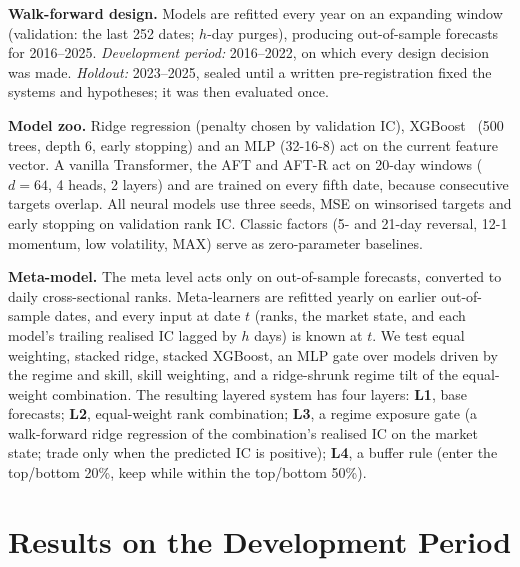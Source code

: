 \textbf{Walk-forward design.} Models are refitted every year on an expanding window (validation: the last 252 dates; $h$-day purges), producing out-of-sample forecasts for 2016--2025. \emph{Development period:} 2016--2022, on which every design decision was made. \emph{Holdout:} 2023--2025, sealed until a written pre-registration fixed the systems and hypotheses; it was then evaluated once.

\textbf{Model zoo.} Ridge regression (penalty chosen by validation IC), XGBoost~\cite{chen2016} (500 trees, depth 6, early stopping) and an MLP (32-16-8) act on the current feature vector. A vanilla Transformer, the AFT and AFT-R act on 20-day windows ($d=64$, 4 heads, 2 layers) and are trained on every fifth date, because consecutive targets overlap. All neural models use three seeds, MSE on winsorised targets and early stopping on validation rank IC. Classic factors (5- and 21-day reversal, 12-1 momentum, low volatility, MAX) serve as zero-parameter baselines.

\textbf{Meta-model.} The meta level acts only on out-of-sample forecasts, converted to daily cross-sectional ranks. Meta-learners are refitted yearly on earlier out-of-sample dates, and every input at date $t$ (ranks, the market state, and each model's trailing realised IC lagged by $h$ days) is known at $t$. We test equal weighting, stacked ridge, stacked XGBoost, an MLP gate over models driven by the regime and skill, skill weighting, and a ridge-shrunk regime tilt of the equal-weight combination. The resulting layered system has four layers: \textbf{L1}, base forecasts; \textbf{L2}, equal-weight rank combination; \textbf{L3}, a regime exposure gate (a walk-forward ridge regression of the combination's realised IC on the market state; trade only when the predicted IC is positive); \textbf{L4}, a buffer rule (enter the top/bottom 20\%, keep while within the top/bottom 50\%).

\section{Results on the Development Period}
\label{sec:results}

\begin{table}[t]
\centering
\caption{Single stock (AAPL), corrected protocol: test period \aTestStart{} to \aTestEnd{} (\aNTest{} origins), 5-day horizon. Mean $\pm$ 95\% CI over five seeds. Sharpe ratio net of 5\,bp per side. DM: Diebold--Mariano $p$-value against the zero forecast (seed-averaged forecast, squared error).}
\label{tab:aapl}
\scriptsize
\setlength{\tabcolsep}{2.5pt}
\end{table}

